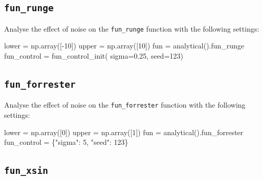 \documentclass[
  letterpaper,
  DIV=11,
  numbers=noendperiod]{scrreprt}
\newenvironment{Shaded}{\begin{snugshade}}{\end{snugshade}}
\newcommand{\DecValTok}[1]{\textcolor[rgb]{0.68,0.00,0.00}{#1}}
\newcommand{\FloatTok}[1]{\textcolor[rgb]{0.68,0.00,0.00}{#1}}
\newcommand{\NormalTok}[1]{\textcolor[rgb]{0.00,0.23,0.31}{#1}}
\newcommand{\OperatorTok}[1]{\textcolor[rgb]{0.37,0.37,0.37}{#1}}
\newcommand{\StringTok}[1]{\textcolor[rgb]{0.13,0.47,0.30}{#1}}
\begin{document}
\hypertarget{fun_runge-2}{%
\subsection{\texorpdfstring{\texttt{fun\_runge}}{fun\_runge}}\label{fun_runge-2}}

Analyse the effect of noise on the \texttt{fun\_runge} function with the
following settings:

\begin{Shaded}
\begin{Highlighting}[]
\NormalTok{lower }\OperatorTok{=}\NormalTok{ np.array([}\OperatorTok{{-}}\DecValTok{10}\NormalTok{])}
\NormalTok{upper }\OperatorTok{=}\NormalTok{ np.array([}\DecValTok{10}\NormalTok{])}
\NormalTok{fun }\OperatorTok{=}\NormalTok{ analytical().fun\_runge}
\NormalTok{fun\_control }\OperatorTok{=}\NormalTok{ fun\_control\_init(    }
\NormalTok{    sigma}\OperatorTok{=}\FloatTok{0.25}\NormalTok{,}
\NormalTok{    seed}\OperatorTok{=}\DecValTok{123}\NormalTok{)}
\end{Highlighting}
\end{Shaded}

\hypertarget{fun_forrester-1}{%
\subsection{\texorpdfstring{\texttt{fun\_forrester}}{fun\_forrester}}\label{fun_forrester-1}}

Analyse the effect of noise on the \texttt{fun\_forrester} function with
the following settings:

\begin{Shaded}
\begin{Highlighting}[]
\NormalTok{lower }\OperatorTok{=}\NormalTok{ np.array([}\DecValTok{0}\NormalTok{])}
\NormalTok{upper }\OperatorTok{=}\NormalTok{ np.array([}\DecValTok{1}\NormalTok{])}
\NormalTok{fun }\OperatorTok{=}\NormalTok{ analytical().fun\_forrester}
\NormalTok{fun\_control }\OperatorTok{=}\NormalTok{ \{}\StringTok{"sigma"}\NormalTok{: }\DecValTok{5}\NormalTok{,}
               \StringTok{"seed"}\NormalTok{: }\DecValTok{123}\NormalTok{\}}
\end{Highlighting}
\end{Shaded}

\hypertarget{fun_xsin-1}{%
\subsection{\texorpdfstring{\texttt{fun\_xsin}}{fun\_xsin}}\label{fun_xsin-1}}
\end{document}
